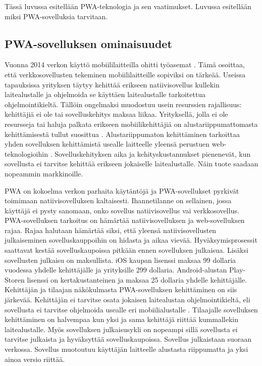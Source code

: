 \documentclass{tktltiki}
\begin{document}
Tässä luvussa esitellään PWA-teknologia ja sen vaatimukset. Luvussa esitellään miksi PWA-sovelluksia tarvitaan.

\subsection{PWA-sovelluksen ominaisuudet}

Vuonna 2014 verkon käyttö mobiililaitteilla ohitti työasemat \cite{tandelimpact}. Tämä osoittaa, että verkkosovellusten tekeminen mobiililaitteille sopiviksi on tärkeää. Useissa tapauksissa yrityksen täytyy kehittää erikseen natiivisovellus kullekin laitealustalle ja ohjelmoida se käyttäen laitealustalle tarkoitettua ohjelmointikieltä. Tällöin ongelmaksi muodostuu usein resurssien rajallisuus: kehittäjiä ei ole tai sovelluskehitys maksaa liikaa. Yrityksellä, jolla ei ole resursseja tai haluja palkata erikseen mobiilikehittäjiä on alustariippumattomasta kehittämisestä tullut suosittua \cite{biorn2017progressive}. Alustariippumaton kehittäminen tarkoittaa yhden sovelluksen kehittämistä usealle laitteelle yleensä perustuen web-teknologioihin \cite{heitkotter2013cross}. Sovelluskehityksen aika ja kehityskustannukset pienenevät, kun sovellusta ei tarvitse kehittää erikseen jokaiselle laitealustalle. Näin tuote saadaan nopeammin markkinoille.

PWA on kokoelma verkon parhaita käytäntöjä \cite{Kapoor} ja PWA-sovellukset pyrkivät toimimaan natiivisovelluksen kaltaisesti. Ihannetilanne on sellainen, jossa käyttäjä ei pysty sanomaan, onko sovellus natiivisovellus vai verkkosovellus. PWA-sovelluksen tarkoitus on hämärtää natiivisovelluksen ja web-sovelluksen rajaa. Rajaa halutaan hämärtää siksi, että yleensä natiivisovellusten julkaiseminen sovelluskauppoihin on hidasta ja aikaa vievää. Hyväksymisprosessit saattavat kestää sovelluskaupoissa pitkään ennen sovelluksen julkaisua. Lisäksi sovellusten julkaisu on maksullista. iOS kaupan lisenssi maksaa 99 dollaria vuodessa yhdelle kehittäjälle ja yrityksille 299 dollaria. Android-alustan Play-Storen lisenssi on kertakustanteinen ja maksaa 25 dollaria yhdelle kehittäjälle. Kehittäjän ja tilaajan näkökulmasta PWA-sovelluksen kehittäminen on siis järkevää. Kehittäjän ei tarvitse osata jokaisen laitealustan ohjelmointikieltä, eli sovellusta ei tarvitse ohjelmoida usealle eri mobiilialustalle \cite{Gazdecki}. Tilaajalle sovelluksen kehittäminen on halvempaa kun yksi ja sama kehittäjä riittää kummallekin laitealustalle. Myös sovelluksen julkaisusykli on nopeampi sillä sovellusta ei tarvitse julkaista ja hyväksyttää sovelluskaupoissa. Sovellus julkaistaan suoraan verkossa. Sovellus muotoutuu käyttäjän laitteelle alustasta riippumatta ja yksi ainoa versio riittää.
\end{document}
